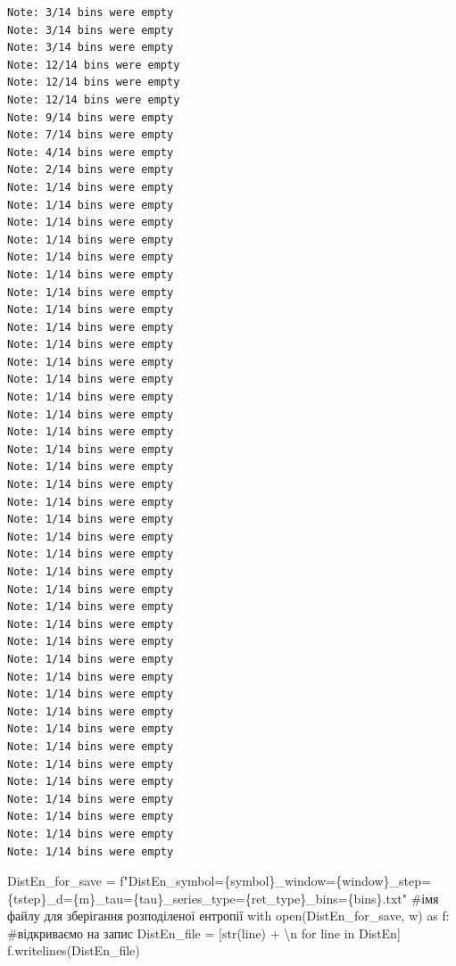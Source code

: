 \documentclass[
  letterpaper,
]{report}
\newenvironment{Shaded}{\begin{snugshade}}{\end{snugshade}}
\newcommand{\BuiltInTok}[1]{\textcolor[rgb]{0.00,0.23,0.31}{#1}}
\newcommand{\CharTok}[1]{\textcolor[rgb]{0.13,0.47,0.30}{#1}}
\newcommand{\CommentTok}[1]{\textcolor[rgb]{0.37,0.37,0.37}{#1}}
\newcommand{\ControlFlowTok}[1]{\textcolor[rgb]{0.00,0.23,0.31}{#1}}
\newcommand{\ImportTok}[1]{\textcolor[rgb]{0.00,0.46,0.62}{#1}}
\newcommand{\KeywordTok}[1]{\textcolor[rgb]{0.00,0.23,0.31}{#1}}
\newcommand{\NormalTok}[1]{\textcolor[rgb]{0.00,0.23,0.31}{#1}}
\newcommand{\OperatorTok}[1]{\textcolor[rgb]{0.37,0.37,0.37}{#1}}
\newcommand{\SpecialCharTok}[1]{\textcolor[rgb]{0.37,0.37,0.37}{#1}}
\newcommand{\SpecialStringTok}[1]{\textcolor[rgb]{0.13,0.47,0.30}{#1}}
\newcommand{\StringTok}[1]{\textcolor[rgb]{0.13,0.47,0.30}{#1}}
\begin{document}
\begin{verbatim}
Note: 3/14 bins were empty
Note: 3/14 bins were empty
Note: 3/14 bins were empty
Note: 12/14 bins were empty
Note: 12/14 bins were empty
Note: 12/14 bins were empty
Note: 9/14 bins were empty
Note: 7/14 bins were empty
Note: 4/14 bins were empty
Note: 2/14 bins were empty
Note: 1/14 bins were empty
Note: 1/14 bins were empty
Note: 1/14 bins were empty
Note: 1/14 bins were empty
Note: 1/14 bins were empty
Note: 1/14 bins were empty
Note: 1/14 bins were empty
Note: 1/14 bins were empty
Note: 1/14 bins were empty
Note: 1/14 bins were empty
Note: 1/14 bins were empty
Note: 1/14 bins were empty
Note: 1/14 bins were empty
Note: 1/14 bins were empty
Note: 1/14 bins were empty
Note: 1/14 bins were empty
Note: 1/14 bins were empty
Note: 1/14 bins were empty
Note: 1/14 bins were empty
Note: 1/14 bins were empty
Note: 1/14 bins were empty
Note: 1/14 bins were empty
Note: 1/14 bins were empty
Note: 1/14 bins were empty
Note: 1/14 bins were empty
Note: 1/14 bins were empty
Note: 1/14 bins were empty
Note: 1/14 bins were empty
Note: 1/14 bins were empty
Note: 1/14 bins were empty
Note: 1/14 bins were empty
Note: 1/14 bins were empty
Note: 1/14 bins were empty
Note: 1/14 bins were empty
Note: 1/14 bins were empty
Note: 1/14 bins were empty
Note: 1/14 bins were empty
Note: 1/14 bins were empty
Note: 1/14 bins were empty
\end{verbatim}

\begin{Shaded}
\begin{Highlighting}[]
\NormalTok{DistEn\_for\_save }\OperatorTok{=} \SpecialStringTok{f"DistEn\_symbol=}\SpecialCharTok{\{}\NormalTok{symbol}\SpecialCharTok{\}}\SpecialStringTok{\_window=}\SpecialCharTok{\{}\NormalTok{window}\SpecialCharTok{\}}\SpecialStringTok{\_step=}\SpecialCharTok{\{}\NormalTok{tstep}\SpecialCharTok{\}}\SpecialStringTok{\_d=}\SpecialCharTok{\{}\NormalTok{m}\SpecialCharTok{\}}\SpecialStringTok{\_tau=}\SpecialCharTok{\{}\NormalTok{tau}\SpecialCharTok{\}}\SpecialStringTok{\_series\_type=}\SpecialCharTok{\{}\NormalTok{ret\_type}\SpecialCharTok{\}}\SpecialStringTok{\_bins=}\SpecialCharTok{\{}\NormalTok{bins}\SpecialCharTok{\}}\SpecialStringTok{.txt"} \CommentTok{\#ім\textquotesingle{}я файлу для зберігання розподіленої ентропії}
\ControlFlowTok{with} \BuiltInTok{open}\NormalTok{(DistEn\_for\_save, }\StringTok{\textquotesingle{}w\textquotesingle{}}\NormalTok{) }\ImportTok{as}\NormalTok{ f: }\CommentTok{\#відкриваємо на запис }
\NormalTok{    DistEn\_file }\OperatorTok{=}\NormalTok{ [}\BuiltInTok{str}\NormalTok{(line) }\OperatorTok{+} \StringTok{\textquotesingle{}}\CharTok{\textbackslash{}n}\StringTok{\textquotesingle{}} \ControlFlowTok{for}\NormalTok{ line }\KeywordTok{in}\NormalTok{ DistEn]}
\NormalTok{    f.writelines(DistEn\_file)}
\end{Highlighting}
\end{Shaded}
\end{document}
